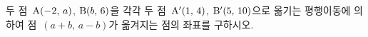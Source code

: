 두 점~$\mathrm{A}(-2,\,a)$, $\mathrm{B}(b,\,6)$을 각각 두 점~$\mathrm{A}'(1,\,4)$, $\mathrm{B}'(5,\,10)$으로 옮기는 평행이동에 의하여 점~$(a+b,\,a-b)$가 옮겨지는 점의 좌표를 구하시오.

